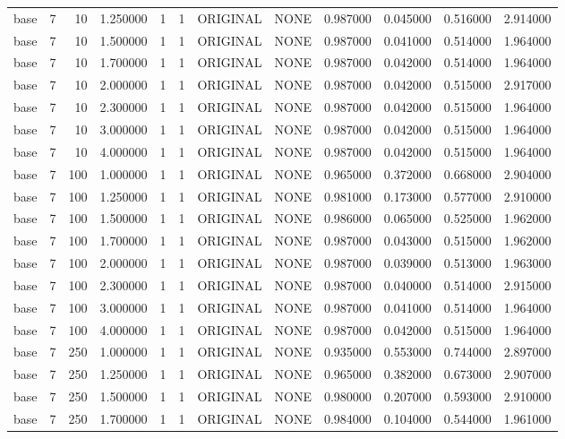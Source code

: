 \begin{tabular}{lrrrllllrrrr}
base & 7 & 10 & 1.250000 & 1 & 1 & ORIGINAL & NONE & 0.987000 & 0.045000 & 0.516000 & 2.914000 \\
base & 7 & 10 & 1.500000 & 1 & 1 & ORIGINAL & NONE & 0.987000 & 0.041000 & 0.514000 & 1.964000 \\
base & 7 & 10 & 1.700000 & 1 & 1 & ORIGINAL & NONE & 0.987000 & 0.042000 & 0.514000 & 1.964000 \\
base & 7 & 10 & 2.000000 & 1 & 1 & ORIGINAL & NONE & 0.987000 & 0.042000 & 0.515000 & 2.917000 \\
base & 7 & 10 & 2.300000 & 1 & 1 & ORIGINAL & NONE & 0.987000 & 0.042000 & 0.515000 & 1.964000 \\
base & 7 & 10 & 3.000000 & 1 & 1 & ORIGINAL & NONE & 0.987000 & 0.042000 & 0.515000 & 1.964000 \\
base & 7 & 10 & 4.000000 & 1 & 1 & ORIGINAL & NONE & 0.987000 & 0.042000 & 0.515000 & 1.964000 \\
base & 7 & 100 & 1.000000 & 1 & 1 & ORIGINAL & NONE & 0.965000 & 0.372000 & 0.668000 & 2.904000 \\
base & 7 & 100 & 1.250000 & 1 & 1 & ORIGINAL & NONE & 0.981000 & 0.173000 & 0.577000 & 2.910000 \\
base & 7 & 100 & 1.500000 & 1 & 1 & ORIGINAL & NONE & 0.986000 & 0.065000 & 0.525000 & 1.962000 \\
base & 7 & 100 & 1.700000 & 1 & 1 & ORIGINAL & NONE & 0.987000 & 0.043000 & 0.515000 & 1.962000 \\
base & 7 & 100 & 2.000000 & 1 & 1 & ORIGINAL & NONE & 0.987000 & 0.039000 & 0.513000 & 1.963000 \\
base & 7 & 100 & 2.300000 & 1 & 1 & ORIGINAL & NONE & 0.987000 & 0.040000 & 0.514000 & 2.915000 \\
base & 7 & 100 & 3.000000 & 1 & 1 & ORIGINAL & NONE & 0.987000 & 0.041000 & 0.514000 & 1.964000 \\
base & 7 & 100 & 4.000000 & 1 & 1 & ORIGINAL & NONE & 0.987000 & 0.042000 & 0.515000 & 1.964000 \\
base & 7 & 250 & 1.000000 & 1 & 1 & ORIGINAL & NONE & 0.935000 & 0.553000 & 0.744000 & 2.897000 \\
base & 7 & 250 & 1.250000 & 1 & 1 & ORIGINAL & NONE & 0.965000 & 0.382000 & 0.673000 & 2.907000 \\
base & 7 & 250 & 1.500000 & 1 & 1 & ORIGINAL & NONE & 0.980000 & 0.207000 & 0.593000 & 2.910000 \\
base & 7 & 250 & 1.700000 & 1 & 1 & ORIGINAL & NONE & 0.984000 & 0.104000 & 0.544000 & 1.961000 \\

\end{tabular}
